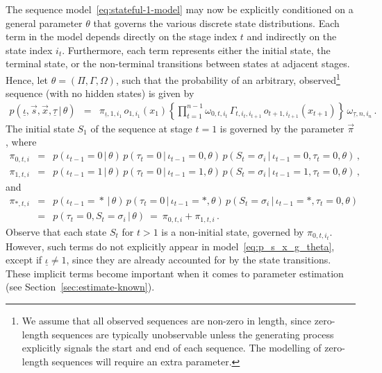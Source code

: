 \documentclass[a4paper]{article}
\newcommand{\ui}{\underline{\iota}}
\newcommand{\ut}{\underline{\tau}}
\begin{document}
The sequence model~\eqref{eq:stateful-1-model}
may now be explicitly conditioned on a general parameter $\theta$
that governs the various discrete state distributions. Each term in the model depends directly on the stage index $t$ and 
indirectly on the state index $i_t$. 
Furthermore, each term represents either the initial state, the terminal state, or the non-terminal transitions
between states at adjacent stages. Hence, let $\theta=(\Pi,\Gamma,\Omega)$, 
such that the probability of an arbitrary, observed\footnote{We assume that all observed sequences are non-zero in length,
since zero-length sequences are typically unobservable unless the generating process explicitly signals the start
and end of each sequence. The modelling of zero-length sequences will require an extra parameter.} sequence (with no hidden states) is given by
\begin{eqnarray}
p(\ui,\vec{s},\vec{x},\ut\,|\,\theta) & = & \pi_{\ui,1,i_1}\,o_{1,i_1}(x_1)\left\{\prod_{t=1}^{n-1}\omega_{0,t,i_t}\,\Gamma_{t,i_t,i_{t+1}}\,o_{t+1,i_{t+1}}(x_{t+1})
\right\}\,\omega_{\ut,n,i_n}
\,.
\label{eq:p_s_x_g_theta}
\end{eqnarray}
The initial state $S_1$ of the sequence at stage $t=1$ is governed by the parameter $\vec{\pi}$, where
\begin{eqnarray}
  \pi_{0,t,i} & = & p(\iota_{t-1}\!=\!0\,|\,\theta)\,p(\tau_t\!=\!0\,|\,\iota_{t-1}\!=\!0,\theta)
      \,p(S_t\!=\!\sigma_{i}\,|\,\iota_{t-1}\!=\!0,\tau_t\!=\!0,\theta)\,,
\\
  \pi_{1,t,i} & = & p(\iota_{t-1}\!=\!1\,|\,\theta)\,p(\tau_t\!=\!0\,|\,\iota_{t-1}\!=\!1,\theta)
      \,p(S_t\!=\!\sigma_{i}\,|\,\iota_{t-1}\!=\!1,\tau_t\!=\!0,\theta)\,,
\end{eqnarray}
and
\begin{eqnarray}
  \pi_{*,t,i} & = & p(\iota_{t-1}\!=\!*\,|\,\theta)\,p(\tau_t\!=\!0\,|\,\iota_{t-1}\!=\!*,\theta)
      \,p(S_t\!=\!\sigma_{i}\,|\,\iota_{t-1}\!=\!*,\tau_t\!=\!0,\theta)
\nonumber\\& = &
  p(\tau_t\!=\!0,S_t\!=\!\sigma_i\,|\,\theta)~=~\pi_{0,t,i}+\pi_{1,t,i}\,.
\label{eq:pi:*}
\end{eqnarray}
Observe that each state $S_t$ for $t>1$ is a non-initial state, governed by $\pi_{0,t,i_t}$. However, such terms do
not explicitly appear in model~\eqref{eq:p_s_x_g_theta}, except if $\ui\ne 1$, 
since they are already accounted for by the state transitions.
These implicit terms become important when it comes to parameter estimation (see Section~\ref{sec:estimate-known}).
\end{document}
